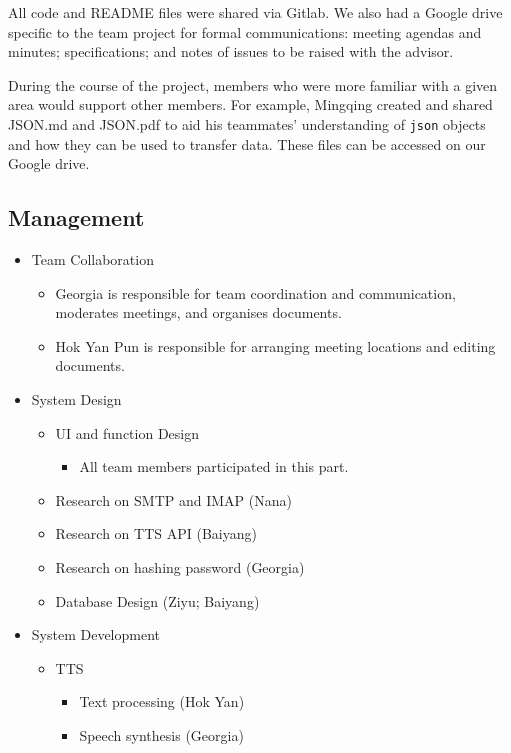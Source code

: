 \documentclass{article}
\begin{document}
All code and README files were shared via Gitlab. We also had a Google drive specific to the team project for formal communications: meeting agendas and minutes; specifications; and notes of issues to be raised with the advisor.

During the course of the project, members who were more familiar with a given area would support other members. For example, Mingqing created and shared JSON.md and JSON.pdf to aid his teammates' understanding of \texttt{json} objects and how they can be used to transfer data. These files can be accessed on our Google drive.

\subsection{Management}
\begin{itemize}
    \item Team Collaboration
    \begin{itemize}
        \item Georgia is responsible for team coordination and communication, moderates meetings, and organises documents.
        \item Hok Yan Pun is responsible for arranging meeting locations and editing documents.
    \end{itemize}
    \item System Design
    \begin{itemize}
        \item UI and function Design
        \begin{itemize}
            \item All team members participated in this part.
        \end{itemize}
        \item Research on SMTP and IMAP (Nana)
        \item Research on TTS API (Baiyang)
        \item Research on hashing password (Georgia)
        \item Database Design (Ziyu; Baiyang)
    \end{itemize}
    \item System Development
    \begin{itemize}
        \item TTS
        \begin{itemize}
            \item Text processing (Hok Yan)
            \item Speech synthesis (Georgia)

\end{itemize}
\end{itemize}
\end{itemize}
\end{document}
